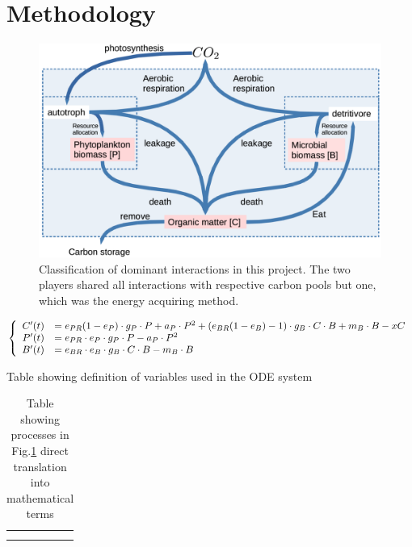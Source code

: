 \documentclass[../thesis.tex]{subfiles} %
\begin{document}
\section{Methodology}

\begin{figure}[H]
    \centering
    \includegraphics[width=.8\linewidth]{result/model.png}
    \caption[Model visualization]{Classification of dominant interactions in this project.  The two players shared all interactions with respective carbon pools but one, which was the energy acquiring method.}
    \label{modelInWord}
\end{figure}

\begin{equation*}\left\{\begin{array}{rl}
    C'(t) &= e_{PR}(1-e_P)\cdot g_P\cdot P +a_P\cdot P^2 +(e_{BR}(1-e_B)-1)\cdot g_B\cdot C\cdot B +m_B\cdot B -xC\\
    P'(t) &= e_{PR}\cdot e_P\cdot g_P\cdot P -a_P\cdot P^2\\
    B'(t) &= e_{BR}\cdot e_B\cdot g_B\cdot C\cdot B -m_B\cdot B
\end{array}\right.\end{equation*}

\begin{table}[H]
    \centering
    \caption[Algebra variables definitions]{Table showing definition of variables used in the ODE system}
    \label{varInTab}
\end{table}

\begin{table}[H]
    \centering
    \caption[Processes in algebra terms]{Table showing processes in Fig.\ref{modelInWord} direct translation into mathematical terms}
    \begin{tabular}{c|c}
         &  \\
         & 
    \end{tabular}
    \label{termInTab}
\end{table}
\end{document}
